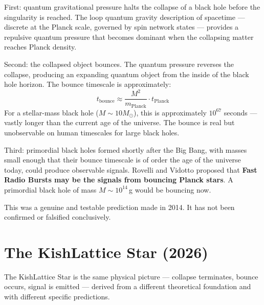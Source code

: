 \documentclass[11pt, letterpaper, openany]{book}
\begin{document}
First: quantum gravitational pressure halts the collapse of a black hole
before the singularity is reached. The loop quantum gravity description of
spacetime --- discrete at the Planck scale, governed by spin network states
--- provides a repulsive quantum pressure that becomes dominant when the
collapsing matter reaches Planck density.

Second: the collapsed object bounces. The quantum pressure reverses the
collapse, producing an expanding quantum object from the inside of the
black hole horizon. The bounce timescale is approximately:
\[
t_\text{bounce} \approx \frac{M^2}{m_\text{Planck}} \cdot t_\text{Planck}
\]
For a stellar-mass black hole ($M \sim 10 M_\odot$), this is approximately
$10^{67}$ seconds --- vastly longer than the current age of the universe.
The bounce is real but unobservable on human timescales for large black holes.

Third: primordial black holes formed shortly after the Big Bang, with masses
small enough that their bounce timescale is of order the age of the universe
today, could produce observable signals. Rovelli and Vidotto proposed that
\textbf{Fast Radio Bursts may be the signals from bouncing Planck stars}.
A primordial black hole of mass $M \sim 10^{14}$\,g would be bouncing now.

This was a genuine and testable prediction made in 2014. It has not been
confirmed or falsified conclusively.

\section{The KishLattice Star (2026)}

The KishLattice Star is the same physical picture --- collapse terminates,
bounce occurs, signal is emitted --- derived from a different theoretical
foundation and with different specific predictions.
\end{document}
